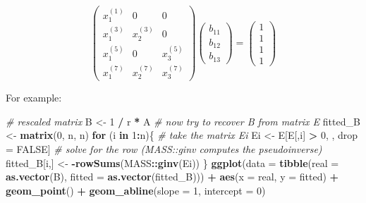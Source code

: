 \documentclass[
]{book}
\newenvironment{Shaded}{\begin{snugshade}}{\end{snugshade}}
\newcommand{\CommentTok}[1]{\textcolor[rgb]{0.56,0.35,0.01}{\textit{#1}}}
\newcommand{\ControlFlowTok}[1]{\textcolor[rgb]{0.13,0.29,0.53}{\textbf{#1}}}
\newcommand{\DataTypeTok}[1]{\textcolor[rgb]{0.13,0.29,0.53}{#1}}
\newcommand{\DecValTok}[1]{\textcolor[rgb]{0.00,0.00,0.81}{#1}}
\newcommand{\KeywordTok}[1]{\textcolor[rgb]{0.13,0.29,0.53}{\textbf{#1}}}
\newcommand{\NormalTok}[1]{#1}
\newcommand{\OperatorTok}[1]{\textcolor[rgb]{0.81,0.36,0.00}{\textbf{#1}}}
\newcommand{\OtherTok}[1]{\textcolor[rgb]{0.56,0.35,0.01}{#1}}
\newcommand{\StringTok}[1]{\textcolor[rgb]{0.31,0.60,0.02}{#1}}
\begin{document}
\[
\begin{pmatrix}
x_1^{(1)} & 0 & 0 \\
x_1^{(3)} & x_2^{(3)} & 0 \\
x_1^{(5)} & 0 & x_3^{(5)} \\
x_1^{(7)} & x_2^{(7)} & x_3^{(7)} 
\end{pmatrix} 
\begin{pmatrix}
b_{11}\\
b_{12}\\
b_{13}
\end{pmatrix} 
= 
\begin{pmatrix}
1\\
1\\
1\\
1
\end{pmatrix}
\]

For example:

\begin{Shaded}
\begin{Highlighting}[]
\CommentTok{# rescaled matrix}
\NormalTok{B <-}\StringTok{ }\DecValTok{1} \OperatorTok{/}\StringTok{ }\NormalTok{r }\OperatorTok{*}\StringTok{ }\NormalTok{A}
\CommentTok{# now try to recover B from matrix E}
\NormalTok{fitted_B <-}\StringTok{ }\KeywordTok{matrix}\NormalTok{(}\DecValTok{0}\NormalTok{, n, n)}
\ControlFlowTok{for}\NormalTok{ (i }\ControlFlowTok{in} \DecValTok{1}\OperatorTok{:}\NormalTok{n)\{}
  \CommentTok{# take the matrix Ei}
\NormalTok{  Ei <-}\StringTok{ }\NormalTok{E[E[,i] }\OperatorTok{>}\StringTok{ }\DecValTok{0}\NormalTok{, , drop =}\StringTok{ }\OtherTok{FALSE}\NormalTok{]}
  \CommentTok{# solve for the row (MASS::ginv computes the pseudoinverse)}
\NormalTok{  fitted_B[i,] <-}\StringTok{ }\OperatorTok{-}\KeywordTok{rowSums}\NormalTok{(MASS}\OperatorTok{::}\KeywordTok{ginv}\NormalTok{(Ei))}
\NormalTok{\}}
\KeywordTok{ggplot}\NormalTok{(}\DataTypeTok{data =} \KeywordTok{tibble}\NormalTok{(}\DataTypeTok{real =} \KeywordTok{as.vector}\NormalTok{(B),}
                     \DataTypeTok{fitted =} \KeywordTok{as.vector}\NormalTok{(fitted_B))) }\OperatorTok{+}\StringTok{ }
\StringTok{  }\KeywordTok{aes}\NormalTok{(}\DataTypeTok{x =}\NormalTok{ real, }\DataTypeTok{y =}\NormalTok{ fitted) }\OperatorTok{+}\StringTok{ }\KeywordTok{geom_point}\NormalTok{() }\OperatorTok{+}\StringTok{ }
\StringTok{  }\KeywordTok{geom_abline}\NormalTok{(}\DataTypeTok{slope =} \DecValTok{1}\NormalTok{, }\DataTypeTok{intercept =} \DecValTok{0}\NormalTok{)}
\end{Highlighting}
\end{Shaded}
\end{document}
